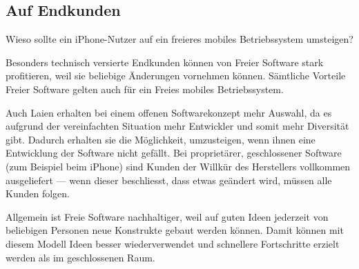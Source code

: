 \subsection{Auf Endkunden}
Wieso sollte ein iPhone-Nutzer auf ein freieres mobiles Betriebssystem umsteigen?

Besonders technisch versierte Endkunden können von Freier Software stark profitieren, weil sie beliebige Änderungen vornehmen können. Sämtliche Vorteile Freier Software gelten auch für ein Freies mobiles Betriebssystem.

Auch Laien erhalten bei einem offenen Softwarekonzept mehr Auswahl, da es aufgrund der vereinfachten Situation mehr Entwickler und somit mehr Diversität gibt. Dadurch erhalten sie die Möglichkeit, umzusteigen, wenn ihnen eine Entwicklung der Software nicht gefällt. Bei proprietärer, geschlossener Software (zum Beispiel beim iPhone) sind Kunden der Willkür des Herstellers vollkommen ausgeliefert --- wenn dieser beschliesst, dass etwas geändert wird, müssen alle Kunden folgen.

Allgemein ist Freie Software nachhaltiger, weil auf guten Ideen jederzeit von beliebigen Personen neue Konstrukte gebaut werden können. Damit können mit diesem Modell Ideen besser wiederverwendet und schnellere Fortschritte erzielt werden als im geschlossenen Raum.